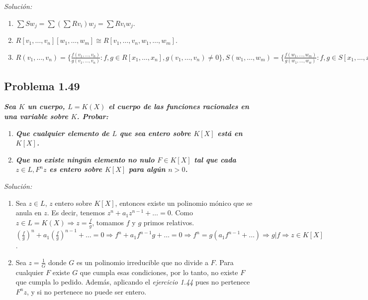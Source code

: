 \textit{Solución: }
    
\begin{enumerate}
\item $\sum S w_j= \sum (\sum R v_i)w_j = \sum R v_i w_j$.
\item $R[v_1,\dots,v_n][w_1,\dots,w_m] \cong R[v_1,\dots,v_n,w_1,\dots,w_m]$.
\item $R(v_1,\dots,v_n)=\{\frac{f(v_1,\dots,v_n)}{g(v_1,\dots,v_n)}: f,g\in R[x_1,\dots,x_n], g(v_1,\dots,v_n)\neq 0 \}, S(w_1,\dots, w_m)= \{\frac{f(w_1,\dots,w_m)}{g(w_1,\dots,w_w)}: f,g\in S[x_1,\dots,x_m], g(w_1,\dots,w_m)\neq 0 \}= \{\frac{f(v_1,\dots,v_n,w_1,\dots,w_m)}{g(v_1,\dots,v_n,w_1,\dots,w_w)}: f,g\in R[x_1,\dots,x_n,y_1,\dots,y_m], g(v_1,\dots,v_n,w_1,\dots,w_m)\neq 0 \} = R(v_1,\dots,v_n,w_1,\dots,w_m)$
\end{enumerate}

\subsection{Problema 1.49}

\textbf{\textit{Sea $K$ un cuerpo, $L=K(X)$ el cuerpo de las funciones racionales en una variable sobre $K$. Probar:}}
\begin{enumerate}
\item \textit{\textbf{Que cualquier elemento de $L$ que sea entero sobre $K[X]$ está en $K[X]$.}}
\item \textit{\textbf{Que no existe ningún elemento no nulo $F\in K[X]$ tal que cada $z\in L, F^nz$ es entero sobre $K[X]$ para algún $n>0$.}}
\end{enumerate}
      
\textit{Solución: }

\begin{enumerate}
\item Sea $z\in L$, $z$ entero sobre $K[X]$, entonces existe un polinomio mónico que se anula en $z$. Es decir, tenemos $z^n+a_1z^{n-1}+\dots =0 $. Como $z\in L=K(X) \Rightarrow z=\frac{f}{g}$, tomamos $f$ y $g$ primos relativos. $(\frac{f}{g})^n+a_1(\frac{f}{g})^{n-1}+\dots = 0 \Rightarrow f^n+a_1f^{n-1}g+\dots =0  \Rightarrow f^n = g(a_1f^{n-1}+\dots) \Rightarrow g | f \Rightarrow z\in K[X]$.
\item Sea $z=\frac{1}{G}$ donde $G$ es un polinomio irreducible que no divide a $F$. Para cualquier $F$ existe $G$ que cumpla esas condiciones, por lo tanto, no existe $F$ que cumpla lo pedido. Además, aplicando el \textit{ejercicio 1.44} pues no pertenece $F^nz$, y si no pertenece no puede ser entero.
\end{enumerate}

